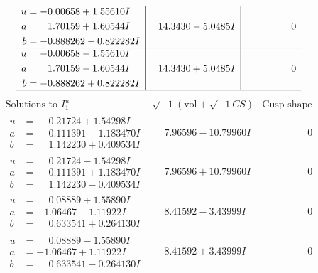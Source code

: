 \documentclass[1p]{elsarticle_modified}
\theoremstyle{definition}
\newcommand{\I}{\sqrt{-1}}
\begin{document}
$$\begin{array}{c|c|c}
\begin{aligned}
u &= -0.00658 + 1.55610 I \\
a &= \phantom{-}1.70159 + 1.60544 I \\
b &= -0.888262 - 0.822282 I\end{aligned}
 & \phantom{-}14.3430 - 5.0485 I & \phantom{-0.000000 } 0 \\ \hline\begin{aligned}
u &= -0.00658 - 1.55610 I \\
a &= \phantom{-}1.70159 - 1.60544 I \\
b &= -0.888262 + 0.822282 I\end{aligned}
 & \phantom{-}14.3430 + 5.0485 I & \phantom{-0.000000 } 0\\
 \hline 
 \end{array}$$\newpage$$\begin{array}{c|c|c}  
\text{Solutions to }I^u_{1}& \I (\text{vol} + \sqrt{-1}CS) & \text{Cusp shape}\\
 \hline 
\begin{aligned}
u &= \phantom{-}0.21724 + 1.54298 I \\
a &= \phantom{-}0.111391 - 1.183470 I \\
b &= \phantom{-}1.142230 + 0.409534 I\end{aligned}
 & \phantom{-}7.96596 - 10.79960 I & \phantom{-0.000000 } 0 \\ \hline\begin{aligned}
u &= \phantom{-}0.21724 - 1.54298 I \\
a &= \phantom{-}0.111391 + 1.183470 I \\
b &= \phantom{-}1.142230 - 0.409534 I\end{aligned}
 & \phantom{-}7.96596 + 10.79960 I & \phantom{-0.000000 } 0 \\ \hline\begin{aligned}
u &= \phantom{-}0.08889 + 1.55890 I \\
a &= -1.06467 - 1.11922 I \\
b &= \phantom{-}0.633541 + 0.264130 I\end{aligned}
 & \phantom{-}8.41592 - 3.43999 I & \phantom{-0.000000 } 0 \\ \hline\begin{aligned}
u &= \phantom{-}0.08889 - 1.55890 I \\
a &= -1.06467 + 1.11922 I \\
b &= \phantom{-}0.633541 - 0.264130 I\end{aligned}
 & \phantom{-}8.41592 + 3.43999 I & \phantom{-0.000000 } 0 \\ \hline\begin{aligned}

\end{aligned}
\end{array}$$
\end{document}
